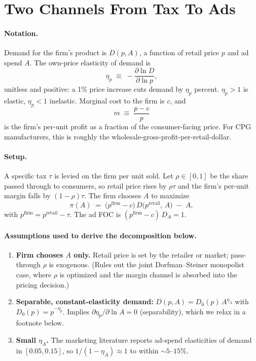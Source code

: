 \documentclass[11pt]{article}
\begin{document}
\section*{Two Channels From Tax To Ads}

\paragraph{Notation.} Demand for the firm's product is
$D(p, A)$, a function of retail price $p$ and ad spend
$A$. The own-price elasticity of demand is
\[
    \eta_p \;\equiv\; -\frac{\partial \ln D}{\partial \ln p},
\]
unitless and positive: a 1\% price increase cuts demand
by $\eta_p$ percent. $\eta_p > 1$ is elastic, $\eta_p < 1$
inelastic. Marginal cost to the firm is $c$, and
\[
    m \;\equiv\; \frac{p - c}{p}
\]
is the firm's per-unit profit as a fraction of the
consumer-facing price. For CPG manufacturers, this is
roughly the wholesale-gross-profit-per-retail-dollar.

\paragraph{Setup.} A specific tax $\tau$ is levied on
the firm per unit sold. Let $\rho \in [0,1]$ be the
share passed through to consumers, so retail price
rises by $\rho\tau$ and the firm's per-unit margin
falls by $(1-\rho)\tau$. The firm chooses $A$ to
maximize
\[
    \pi(A) \;=\;
    \big(p^{\text{firm}} - c\big)\,
    D\!\big(p^{\text{retail}},\, A\big)
    \;-\; A,
\]
with $p^{\text{firm}} = p^{\text{retail}} - \tau$. The
ad FOC is $(p^{\text{firm}}-c)\, D_A = 1$.

\paragraph{Assumptions used to derive the
decomposition below.}
\begin{enumerate}
    \item \textbf{Firm chooses $A$ only.} Retail price
    is set by the retailer or market; pass-through
    $\rho$ is exogenous. (Rules out the joint
    Dorfman--Steiner monopolist case, where $\rho$ is
    optimized and the margin channel is absorbed into
    the pricing decision.)
    \item \textbf{Separable, constant-elasticity
    demand:} $D(p, A) = D_0(p)\, A^{\eta_A}$ with
    $D_0(p) = p^{-\eta_p}$. Implies
    $\partial \eta_p / \partial \ln A = 0$
    (separability), which we relax in a footnote
    below.
    \item \textbf{Small $\eta_A$.} The marketing
    literature reports ad-spend elasticities of demand
    in $[0.05, 0.15]$, so $1/(1-\eta_A) \approx 1$ to
    within $\sim 5\text{--}15\%$.
\end{enumerate}
\end{document}
